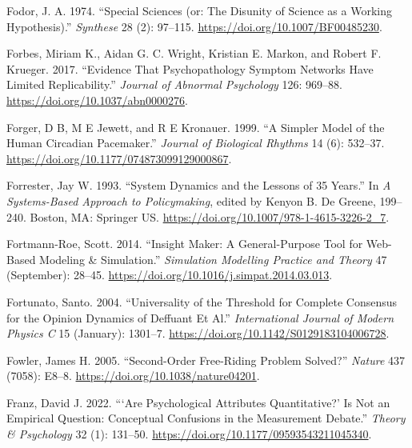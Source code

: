 \documentclass[
  a4paper,
  DIV=11,
  numbers=noendperiod,
  oneside]{scrreprt}
\newlength{\cslhangindent}
\newlength{\cslentryspacingunit} %
\newenvironment{CSLReferences}[2] %
 {%
  \setlength{\parindent}{0pt}
  \ifodd #1
  \let\oldpar\par
  \def\par{\hangindent=\cslhangindent\oldpar}
  \fi
  \setlength{\parskip}{#2\cslentryspacingunit}
 }%
 {}
\begin{document}
\begin{CSLReferences}{1}{0}
\leavevmode{}%
Fodor, J. A. 1974. {``Special Sciences (or: {The} Disunity of Science as
a Working Hypothesis).''} \emph{Synthese} 28 (2): 97--115.
\url{https://doi.org/10.1007/BF00485230}.

\leavevmode{}%
Forbes, Miriam K., Aidan G. C. Wright, Kristian E. Markon, and Robert F.
Krueger. 2017. {``Evidence That Psychopathology Symptom Networks Have
Limited Replicability.''} \emph{Journal of Abnormal Psychology} 126:
969--88. \url{https://doi.org/10.1037/abn0000276}.

\leavevmode{}%
Forger, D B, M E Jewett, and R E Kronauer. 1999. {``A Simpler Model of
the Human Circadian Pacemaker.''} \emph{Journal of Biological Rhythms}
14 (6): 532--37. \url{https://doi.org/10.1177/074873099129000867}.

\leavevmode{}%
Forrester, Jay W. 1993. {``System {Dynamics} and the {Lessons} of 35
{Years}.''} In \emph{A {Systems-Based Approach} to {Policymaking}},
edited by Kenyon B. De Greene, 199--240. {Boston, MA}: {Springer US}.
\url{https://doi.org/10.1007/978-1-4615-3226-2_7}.

\leavevmode{}%
Fortmann-Roe, Scott. 2014. {``Insight {Maker}: {A} General-Purpose Tool
for Web-Based Modeling \& Simulation.''} \emph{Simulation Modelling
Practice and Theory} 47 (September): 28--45.
\url{https://doi.org/10.1016/j.simpat.2014.03.013}.

\leavevmode{}%
Fortunato, Santo. 2004. {``Universality of the {Threshold} for {Complete
Consensus} for the {Opinion Dynamics} of {Deffuant} Et Al.''}
\emph{International Journal of Modern Physics C} 15 (January): 1301--7.
\url{https://doi.org/10.1142/S0129183104006728}.

\leavevmode{}%
Fowler, James H. 2005. {``Second-Order Free-Riding Problem Solved?''}
\emph{Nature} 437 (7058): E8--8.
\url{https://doi.org/10.1038/nature04201}.

\leavevmode{}%
Franz, David J. 2022. {``{`{Are} Psychological Attributes
Quantitative?'} Is Not an Empirical Question: {Conceptual} Confusions in
the Measurement Debate.''} \emph{Theory \& Psychology} 32 (1): 131--50.
\url{https://doi.org/10.1177/09593543211045340}.


\end{CSLReferences}
\end{document}

